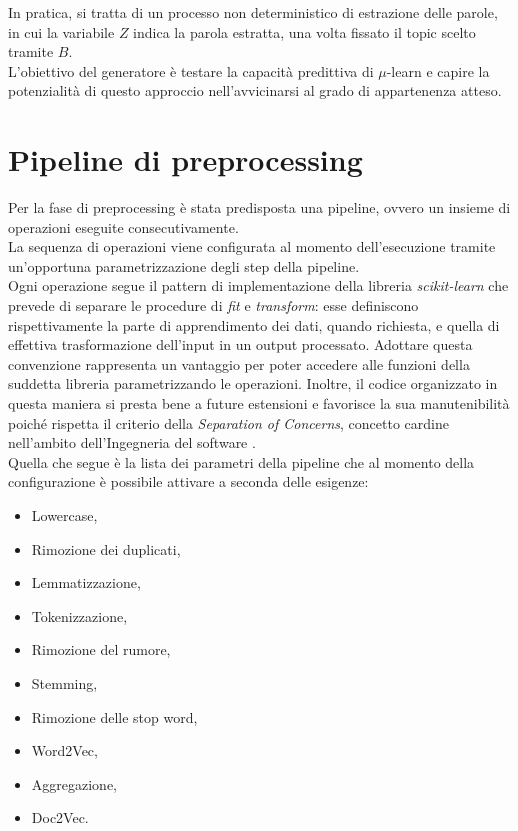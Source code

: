 \documentclass[12pt]{report}
\theoremstyle{definition}
\begin{document}
In pratica, si tratta di un processo non deterministico di estrazione delle parole, in cui la variabile $Z$ indica la parola estratta, una volta fissato il topic scelto tramite $B$.
\\
L'obiettivo del generatore è testare la capacità predittiva di $\mu$-learn e capire la potenzialità di questo approccio nell'avvicinarsi al grado di appartenenza atteso.

\section{Pipeline di preprocessing}\label{pp}
Per la fase di preprocessing è stata predisposta una pipeline, ovvero un insieme di operazioni eseguite consecutivamente.
\\
La sequenza di operazioni viene configurata al momento dell'esecuzione tramite un'opportuna parametrizzazione degli step della pipeline.
\\
Ogni operazione segue il pattern di implementazione della libreria \textit{scikit-learn} che prevede di separare le procedure di \textit{fit} e \textit{transform}: esse definiscono rispettivamente la parte di apprendimento dei dati, quando richiesta, e quella di effettiva trasformazione dell'input in un output processato.
Adottare questa convenzione rappresenta un vantaggio per poter accedere alle funzioni della suddetta libreria parametrizzando le operazioni.
Inoltre, il codice organizzato in questa maniera si presta bene a future estensioni e favorisce la sua manutenibilità poiché rispetta il criterio della \textit{Separation of Concerns}, concetto cardine nell'ambito dell'Ingegneria del software \cite{32}.
\\
Quella che segue è la lista dei parametri della pipeline che al momento della configurazione è possibile attivare a seconda delle esigenze:
\begin{itemize}
    \item Lowercase,
    \item Rimozione dei duplicati,
    \item Lemmatizzazione,
    \item Tokenizzazione,
    \item Rimozione del rumore,
    \item Stemming,
    \item Rimozione delle stop word,
    \item Word2Vec,
    \item Aggregazione,
    \item Doc2Vec.
\end{itemize}
\end{document}

